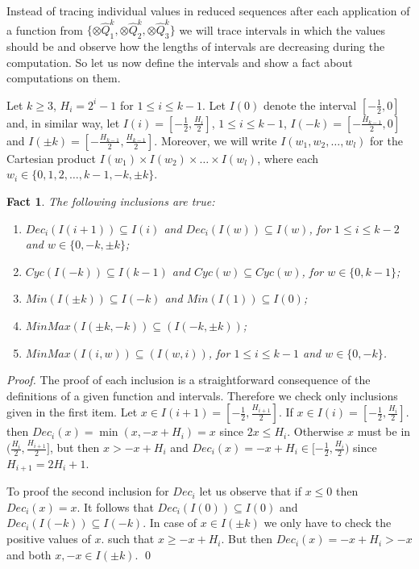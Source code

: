 \documentclass{llncs}
\newtheorem{fact}[theorem]{Fact}
\begin{document}
Instead of tracing individual values in reduced sequences after each
application of a function from
$\{\otimes\hat{Q}^k_1,\otimes\hat{Q}^k_2,\otimes\hat{Q}^k_3\}$ we 
will
trace intervals in which the values should be and observe how the
lengths of intervals are decreasing during the computation. So let us
now define the intervals and show a fact about computations on them.
\begin{definition} \label{interval}
Let $k\ge 3$, $H_i=2^i-1$ for $1\le i\le k-1$. Let $I(0)$ denote the
interval $[-\frac 12,0]$ and, in similar way, let $I(i) = [-\frac
  12,\frac{H_i}{2}]$, $1\le i\le k-1$, $I(-k) = [-\frac{H_{k-1}}{2},0]$
and $I(\pm k) = [-\frac{H_{k-1}}{2},\frac{H_{k-1}}{2}]$. Moreover, we
will write $I(w_1,w_2,\ldots,w_l)$ for the Cartesian product $I(w_1)
\times I(w_2) \times \ldots \times I(w_l)$, where each $w_i \in
\{0,1,2,\ldots,k-1,-k,\pm k\}$.
\end{definition}
\begin{fact} \label{fct-12}
The following inclusions are true:
\begin{enumerate}
\item $Dec_i(I(i+1))\subseteq I(i)$ and 
  $Dec_i(I(w))\subseteq I(w)$, for $1\le i\le k-2$ and $w\in\{0,-k,\pm k\}$;
\item $Cyc(I(-k)) \subseteq I(k-1)$ and 
  $Cyc(w)\subseteq Cyc(w)$, for $w\in\{0,k-1\}$;
\item $Min(I(\pm k)) \subseteq I(-k)$ and $Min(I(1)) \subseteq I(0)$;
\item $MinMax(I(\pm k,-k)) \subseteq (I(-k,\pm k))$;
\item $MinMax(I(i,w)) \subseteq (I(w,i))$, 
                              for $1\le i\le k-1$ and $w\in\{0,-k\}$.
\end{enumerate}
\end{fact}
\begin{proof}
The proof of each inclusion is a straightforward consequence of the
definitions of a given function and intervals. Therefore we check only
inclusions given in the first item. Let $x\in I(i+1) = [-\frac
  12,\frac{H_{i+1}}{2}]$. If $x\in I(i) = [-\frac
  12,\frac{H_i}{2}]$. then $Dec_i(x) = \min(x,-x+H_i) = x$ since $2x\le
H_i$. Otherwise $x$ must be in $(\frac{H_i}{2},\frac{H_{i+1}}{2}]$, but
  then $x > -x+H_i$ and $Dec_i(x) = -x+H_i \in [-\frac
    12,\frac{H_i}{2})$ since $H_{i+1} = 2H_i+1$.

To proof the second inclusion for $Dec_i$ let us observe that if $x\le 0$
then $Dec_i(x) = x$. It follows that $Dec_i(I(0))\subseteq I(0)$ and
$Dec_i(I(-k))\subseteq I(-k)$. In case of $x\in I(\pm k)$ we only have
to check the positive values of $x$. such that $x\ge -x+H_i$. But then
$Dec_i(x) = -x+H_i > -x$ and both $x,-x\in I(\pm k)$. \qed
\end{proof}
\end{document}
